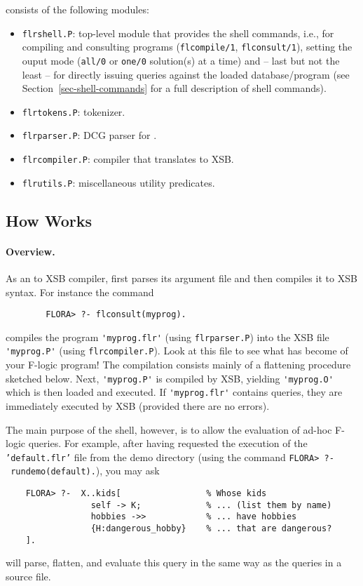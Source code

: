 \documentclass[11pt]{report}
\begin{document}
\FLORA consists of the following modules:
\begin{itemize}
\item \texttt{flrshell.P}: top-level module that provides the \FLORA shell
  commands, i.e., for compiling and consulting \FLORA programs
  (\texttt{flcompile/1}, \texttt{flconsult/1}), setting the ouput mode
  (\texttt{all/0} or \texttt{one/0} solution(s) at a time) and -- last
  but not the least -- for directly issuing queries against the loaded
  database/program (see Section~\ref{sec-shell-commands} for a full description
  of shell commands).
\item \texttt{flrtokens.P}: \FLORA tokenizer.
\item \texttt{flrparser.P}: DCG parser for \fl.
\item \texttt{flrcompiler.P}: \FLORA compiler that translates \fl to XSB.
\item \texttt{flrutils.P}: miscellaneous utility predicates.
\end{itemize}



\subsection{How \FLORA Works}



\paragraph{Overview.}

As an \fl to XSB compiler, \FLORA first parses its argument file and then
compiles it to XSB syntax. For instance the command
\begin{verbatim}
        FLORA> ?- flconsult(myprog).
\end{verbatim}
compiles the program \verb|'myprog.flr'| (using \texttt{flrparser.P}) into
the XSB file \verb|'myprog.P'| (using \texttt{flrcompiler.P}).  Look at
this file to see what has become of your F-logic program! The compilation
consists mainly of a flattening procedure sketched below.  Next,
\verb|'myprog.P'| is compiled by XSB, yielding \verb|'myprog.O'| which is
then loaded and executed.  If \verb|'myprog.flr'| contains queries, they are
immediately executed by XSB (provided there are no errors).

The main purpose of the \FLORA shell, however, is to allow the evaluation
of ad-hoc F-logic queries. For example, after having requested the
execution of the \texttt{'default.flr'} file from the demo directory (using
the command \texttt{FLORA>~?-~rundemo(default).}), you may ask
\begin{verbatim}
    FLORA> ?-  X..kids[                 % Whose kids
                 self -> K;             % ... (list them by name)
                 hobbies ->>            % ... have hobbies
                 {H:dangerous_hobby}    % ... that are dangerous?
    ]. 
\end{verbatim}
\FLORA will parse, flatten, and evaluate this query in the same way as
the queries in a source file.
\end{document}
